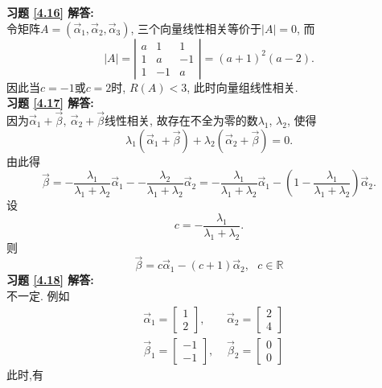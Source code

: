 \documentclass[a4paper]{book}
\begin{document}
\textbf{习题 \ref{4.16} 解答:}\\
令矩阵$A=(\vec{\alpha}_1,\vec{\alpha}_2,\vec{\alpha}_3)$, 三个向量线性相关等价于$|A|=0$, 而
$$|A|=\left|\begin{array}{ccc}a&1&1\\1&a&-1\\1&-1&a\end{array}\right|=(a+1)^2(a-2).$$
因此当$c=-1$或$c=2$时, $R(A)<3$, 此时向量组线性相关.\\
\textbf{习题 \ref{4.17} 解答:}\\
因为$\vec{\alpha}_1+\vec{\beta}, \ \vec{\alpha}_2+\vec{\beta}$线性相关, 故存在不全为零的数$\lambda_1$, $\lambda_2$, 使得
$$\lambda_1(\vec{\alpha}_1+\vec{\beta})+\lambda_2(\vec{\alpha}_2+\vec{\beta})=0.$$
由此得
$$\vec{\beta}=-\frac{\lambda_1}{\lambda_1+\lambda_2}\vec{\alpha}_1--\frac{\lambda_2}{\lambda_1+\lambda_2}\vec{\alpha}_2
=-\frac{\lambda_1}{\lambda_1+\lambda_2}\vec{\alpha}_1
-(1-\frac{\lambda_1}{\lambda_1+\lambda_2})\vec{\alpha}_2.$$
设$$c=-\frac{\lambda_1}{\lambda_1+\lambda_2}.$$
则$$\vec{\beta}=c\vec{\alpha}_1-(c+1)\vec{\alpha}_2,\ \ \ c\in\mathbb{R}$$
\textbf{习题 \ref{4.18} 解答:}\\
不一定. 例如
\begin{displaymath}\begin{aligned} &\vec{\alpha}_1=\begin{bmatrix}1\\2\end{bmatrix},\ \ \ \ \ &\vec{\alpha}_2=\begin{bmatrix}2\\4\end{bmatrix}\\&\vec{\beta}_1=\begin{bmatrix}-1\\-1\end{bmatrix}
, &\vec{\beta}_2=\begin{bmatrix}0\\0\end{bmatrix}\end{aligned}\end{displaymath}
此时,有
\end{document}
